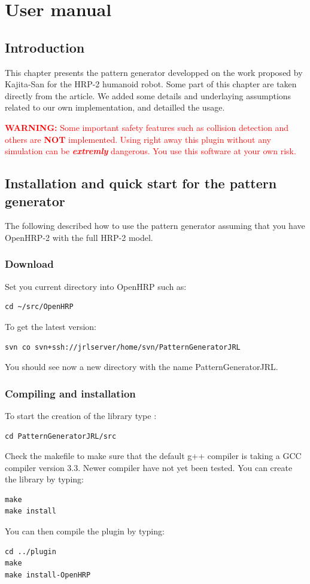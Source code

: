 \chapter{User manual}

\section{Introduction}
This chapter presents the pattern generator developped on the work proposed by Kajita-San \cite{Kajita2003}
for the HRP-2 humanoid robot.
Some part of this chapter are taken directly from the article.
We added some details and underlaying assumptions related to our own implementation, and detailled the usage.
\par
\textcolor{red}{\textbf{WARNING:} Some important safety features such as collision detection and others are \textbf{NOT}
implemented. Using right away this plugin without any simulation can be \textbf{\textit{extremly}}
dangerous. You use this software at your own risk.}

\section{Installation and quick start for the pattern generator}

The following described how to use the pattern generator assuming that you have OpenHRP-2 with the full
HRP-2 model.

\subsection{Download}
Set you current directory into OpenHRP such as:
\begin{verbatim}
cd ~/src/OpenHRP
\end{verbatim}
To get the latest version:
\begin{verbatim}
svn co svn+ssh://jrlserver/home/svn/PatternGeneratorJRL
\end{verbatim}
You should see now a new directory with the name PatternGeneratorJRL.

\subsection{Compiling and installation}
To start the creation of the library type :
\begin{verbatim}
cd PatternGeneratorJRL/src
\end{verbatim}
Check the makefile to make sure that the default g++ compiler is taking 
a GCC compiler version 3.3. Newer compiler have not yet been tested.
You can create the library by typing:
\begin{verbatim}
make
make install
\end{verbatim}
You can then compile the plugin by typing:
\begin{verbatim}
cd ../plugin
make
make install-OpenHRP
\end{verbatim}

